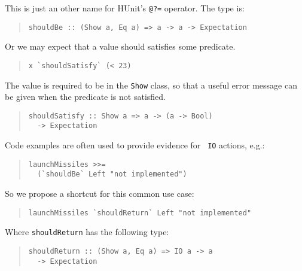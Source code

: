\documentclass[preprint]{sigplanconf}
\begin{document}
\noindent This is just an other name for HUnit's \texttt{@?=}
operator.  The type is:

\begin{quote}
\small
\begin{verbatim}
shouldBe :: (Show a, Eq a) => a -> a -> Expectation
\end{verbatim}
\end{quote}

\noindent Or we may expect that a value should satisfies some
predicate.

\begin{quote}
\small
\begin{verbatim}
x `shouldSatisfy` (< 23)
\end{verbatim}
\end{quote}

\noindent The value is required to be in the \texttt{Show} class, so that a
useful error message can be given when the predicate is not satisfied.

\begin{quote}
\small
\begin{verbatim}
shouldSatisfy :: Show a => a -> (a -> Bool)
  -> Expectation
\end{verbatim}
\end{quote}

\noindent Code examples are often used to provide evidence for {\tt
IO} actions, e.g.:

\begin{quote}
\small
\begin{verbatim}
launchMissiles >>=
  (`shouldBe` Left "not implemented")
\end{verbatim}
\end{quote}

\noindent So we propose a shortcut for this common use case:

\begin{quote}
\small
\begin{verbatim}
launchMissiles `shouldReturn` Left "not implemented"
\end{verbatim}
\end{quote}

\noindent Where \verb|shouldReturn| has the following type:

\begin{quote}
\small
\begin{verbatim}
shouldReturn :: (Show a, Eq a) => IO a -> a
  -> Expectation
\end{verbatim}
\end{quote}
\end{document}
